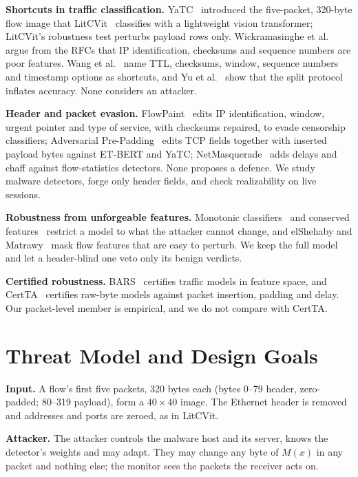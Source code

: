 \documentclass[journal]{IEEEtran}
\begin{document}
\textbf{Shortcuts in traffic classification.} YaTC~\cite{zhao2023yatc} introduced the five-packet, 320-byte flow image that LitCVit~\cite{nisa2026litcvit} classifies with a lightweight vision transformer; LitCVit's robustness test perturbs payload rows only. Wickramasinghe et al.~\cite{wickramasinghe2025sok} argue from the RFCs that IP identification, checksums and sequence numbers are poor features. Wang et al.~\cite{wang2026shadows} name TTL, checksums, window, sequence numbers and timestamp options as shortcuts, and Yu et al.~\cite{yu2026shortcut} show that the split protocol inflates accuracy. None considers an attacker.

\textbf{Header and packet evasion.} FlowPaint~\cite{ling2026flowpaint} edits IP identification, window, urgent pointer and type of service, with checksums repaired, to evade censorship classifiers; Adversarial Pre-Padding~\cite{prepadding2025} edits TCP fields together with inserted payload bytes against ET-BERT and YaTC; NetMasquerade~\cite{liu2025netmasquerade} adds delays and chaff against flow-statistics detectors. None proposes a defence. We study malware detectors, forge only header fields, and check realizability on live sessions.

\textbf{Robustness from unforgeable features.} Monotonic classifiers~\cite{incer2018monotonic} and conserved features~\cite{tong2019conserved} restrict a model to what the attacker cannot change, and elShehaby and Matrawy~\cite{elshehaby2024perturb} mask flow features that are easy to perturb. We keep the full model and let a header-blind one veto only its benign verdicts.

\textbf{Certified robustness.} BARS~\cite{wang2023bars} certifies traffic models in feature space, and CertTA~\cite{yan2025certta} certifies raw-byte models against packet insertion, padding and delay. Our packet-level member is empirical, and we do not compare with CertTA.

\section{Threat Model and Design Goals}
\label{sec:threat}

\textbf{Input.} A flow's first five packets, 320 bytes each (bytes 0--79 header, zero-padded; 80--319 payload), form a $40\times40$ image. The Ethernet header is removed and addresses and ports are zeroed, as in LitCVit.

\textbf{Attacker.} The attacker controls the malware host and its server, knows the detector's weights and may adapt. They may change any byte of $M(x)$ in any packet and nothing else; the monitor sees the packets the receiver acts on.
\end{document}
